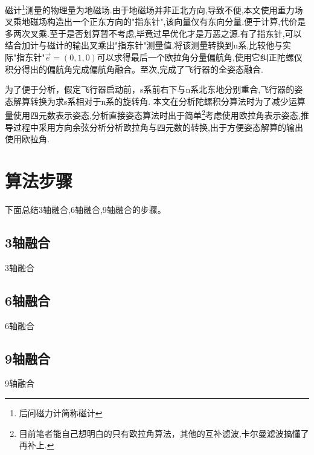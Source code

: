 \documentclass[10pt,a4paper]{article}
\begin{document}
磁计\footnote{后问磁力计简称磁计}测量的物理量为地磁场.由于地磁场并非正北方向,导致不便,本文使用重力场叉乘地磁场构造出一个正东方向的"指东针",该向量仅有东向分量.便于计算,代价是多两次叉乘.至于是否划算暂不考虑,毕竟过早优化才是万恶之源.有了指东针,可以结合加计与磁计的输出叉乘出"指东针"测量值,将该测量转换到n系,比较他与实际"指东针"$\vec{e}=(0,1,0)$可以求得最后一个欧拉角分量偏航角,使用它纠正陀螺仪积分得出的偏航角完成偏航角融合。至次,完成了飞行器的全姿态融合.

为了便于分析，假定飞行器启动前，s系前右下与n系北东地分别重合,飞行器的姿态解算转换为求s系相对于n系的旋转角. 本文在分析陀螺积分算法时为了减少运算量使用四元数表示姿态,分析直接姿态算法时出于简单\footnote{目前笔者能自己想明白的只有欧拉角算法，其他的互补滤波,卡尔曼滤波搞懂了再补上.}考虑使用欧拉角表示姿态,推导过程中采用方向余弦分析分析欧拉角与四元数的转换,出于方便姿态解算的输出使用欧拉角.



\section{算法步骤}\label{section:最终结论}
下面总结3轴融合,6轴融合,9轴融合的步骤。
\subsection{3轴融合}
3轴融合

\subsection{6轴融合}
6轴融合

\subsection{9轴融合}
9轴融合


\newpage
\renewcommand\refname{参考文献}
\centering %


\end{document}
